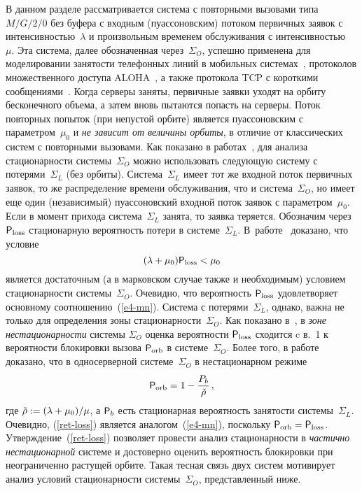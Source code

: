 \begin{multicols}{2}
В данном разделе рассматривается  система с повторными вызовами типа $M/G/2/0$
без буфера  с входным (пуассоновским) потоком первичных заявок с интенсивностью~$\lambda$
 и произвольным  временем  обслуживания  с интенсивностью~ $\mu$.  
 Эта сис\-те\-ма, далее обозначенная через~$\Sigma_O$,  успешно
применена для моделировании занятости телефонных линий в мобильных сис\-те\-мах~\cite{F86}, 
протоколов множественного доступа ALOHA~\cite{C93}, а также
 протокола  TCP с короткими сообщениями~\cite{AY08}. Когда серверы заняты, первичные заявки
 уходят  на орбиту  бесконечного объема, а затем вновь пытаются попасть  на серверы.
  Поток повторных попыток (при непустой орбите) является пуассоновским с  па\-ра\-мет\-ром~$\mu_0$ 
  и  {\it не зависит от величины орбиты}, в отличие от классических  сис\-тем с повторными вызовами.
Как показано в работах~\cite{Avr, GM, MorNek},  для анализа стационарности сис\-те\-мы~$\Sigma_O$
можно использовать  следующую сис\-те\-му с потерями~$\Sigma_L$ (без орбиты).
 Сис\-те\-ма~$\Sigma_L$ имеет  тот же входной   поток первичных заявок, то же распределение
  времени обслуживания, что и сис\-те\-ма~$\Sigma_O$, но
  имеет еще  один (независимый) пуассоновский входной поток заявок с параметром~$\mu_0$.
 Если в момент прихода  сис\-те\-ма~$\Sigma_L$ занята, то заявка   теряется.
 Обозначим через ${\sf P}_{\mathrm{loss}}$ стационарную вероятность потери в сис\-те\-ме~$ \Sigma_L $. 
 В~работе~\cite {Avr} доказано,  что условие 
 \begin{equation}
(\lambda+\mu_0){\sf P}_{\mathrm{loss}}<\mu_0 
\label{st_cond}
\end{equation}
является достаточным (а в марковском случае также и необходимым) условием стационарности
сис\-те\-мы~$\Sigma_O$. Очевидно, что вероятность ${\sf P}_{\mathrm{loss}}$ удовлетворяет
основному соотношению~(\ref{e4-mn}). Сис\-те\-ма с потерями~$ \Sigma_L $, однако, важна
не только для определения зоны стационарности~$\Sigma_O$. Как показано в~\cite{Minsk, GM}, 
в {\it зоне нестационарности} системы $\Sigma_O$ оценка
вероятности ${\sf P}_{\mathrm{loss}}$ сходится c в.~1 к вероятности блокировки вызова
${\sf P}_{\mathrm{orb}}$ в сис\-те\-ме~$\Sigma_O$. Более того, в работе~\cite{MorNek} доказано,
что в односерверной сис\-те\-ме~$\Sigma_O$ в нестационарном режиме 
\begin{equation}
\label{ret-loss} 
{\sf P}_{\mathrm{orb}}=1-\displaystyle\frac{\displaystyle P_b\mathstrut}{\displaystyle \tilde{\rho}\mathstrut}\,, 
\end{equation} 
где $\tilde{\rho}:=(\lambda\hm+ \mu_0)/\mu $, а ${\sf P}_b$ есть стационарная веро\-ятность
занятости системы~$\Sigma_L $. Очевидно, (\ref{ret-loss}) является  аналогом~(\ref{e4-mn}), 
поскольку $\p_{\mathrm{orb}}\hm=\p_{\mathrm{loss}}$. Утверждение~(\ref{ret-loss})  поз\-во\-ля\-ет
провести анализ стационарности в {\it частично нестационарной} сис\-те\-ме и
достоверно оценить вероятность блокировки при неограниченно
растущей орбите. Такая тесная связь двух систем мотивирует анализ условий
стационарности системы~$\Sigma_O$, представленный ниже.


\end{multicols}
